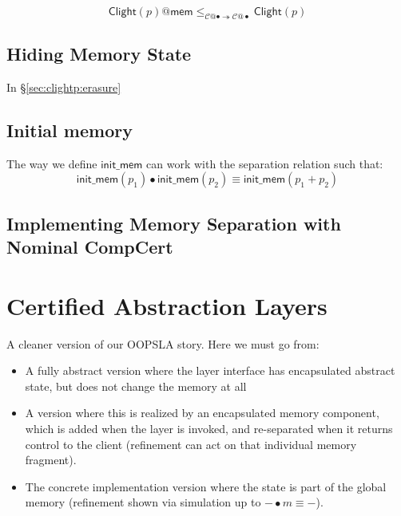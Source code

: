 \documentclass[acmsmall,screen,review,anonymous]{acmart}
\newcommand{\kw}[1]{\ensuremath{ \mathsf{#1} }}
\begin{document}
\begin{lemma}
\[
  \kw{Clight}(p)@\kw{mem}
  \le_{\mathcal{C}@{\bullet} \twoheadrightarrow \mathcal{C}@{\bullet}}
  \kw{Clight}(p)
\]
\end{lemma}


\subsection{Hiding Memory State} %

In \S\ref{sec:clightp:erasure}



\subsection{Initial memory} %

The way we define $\kw{init\_mem}$ can work with the
separation relation such that:
\[
  \kw{init\_mem}(p_1) \bullet \kw{init\_mem}(p_2) \equiv
  \kw{init\_mem}(p_1 + p_2)
\]


\subsection{Implementing Memory Separation with Nominal CompCert} %



\section{Certified Abstraction Layers} \label{sec:cal} %

A cleaner version of our OOPSLA story.
Here we must go from:
\begin{itemize}
  \item A fully abstract version where the layer interface
    has encapsulated abstract state,
    but does not change the memory at all
  \item A version where this is realized by an encapsulated
    memory component,
    which is added when the layer is invoked,
    and re-separated when it returns control to the client
    (refinement can act on that individual memory fragment).
  \item The concrete implementation version
    where the state is part of the global memory
    (refinement shown via
    simulation up to ${-} \bullet m \equiv {-}$).
\end{itemize}
\end{document}
